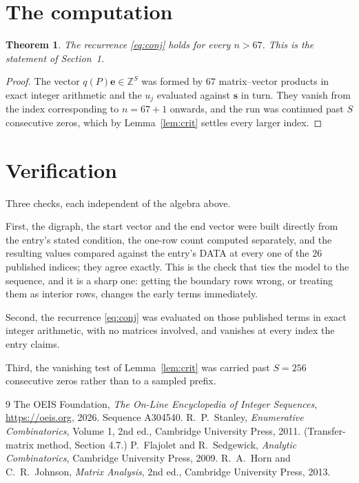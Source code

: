 \documentclass[11pt,a4paper]{article}
\theoremstyle{plain}
\newtheorem{theorem}{Theorem}
\theoremstyle{definition}
\begin{document}
\section{The computation}

\begin{theorem}
The recurrence \eqref{eq:conj} holds for every $n>67$. This is the statement of
Section~1.
\end{theorem}

\begin{proof}
The vector $q(P)\mathbf{e}\in\mathbb{Z}^{S}$ was formed by $67$ matrix--vector
products in exact integer arithmetic and the $u_j$ evaluated against $\mathbf{s}$ in turn.
They vanish from the index corresponding to $n=67+1$ onwards, and the run was continued
past $S$ consecutive zeros, which by Lemma~\ref{lem:crit} settles every larger index.
\end{proof}

\section{Verification}

Three checks, each independent of the algebra above.

First, the digraph, the start vector and the end vector were built directly from the
entry's stated condition, the one-row count computed separately, and the resulting values
compared against the entry's DATA at every one of the $26$ published indices; they
agree exactly. This is the check that ties the model to the sequence, and it is a sharp one:
getting the boundary rows wrong, or treating them as interior rows, changes the early terms
immediately.

Second, the recurrence \eqref{eq:conj} was evaluated on those published terms in exact
integer arithmetic, with no matrices involved, and vanishes at every index the entry claims.

Third, the vanishing test of Lemma~\ref{lem:crit} was carried past $S=256$ consecutive
zeros rather than to a sampled prefix.

\begin{thebibliography}{9}
 The OEIS Foundation, \emph{The On-Line Encyclopedia of Integer
Sequences}, \url{https://oeis.org}, 2026. Sequence A304540.
 R.~P.~Stanley, \emph{Enumerative Combinatorics}, Volume 1, 2nd ed.,
Cambridge University Press, 2011. (Transfer-matrix method, Section 4.7.)
 P.~Flajolet and R.~Sedgewick, \emph{Analytic Combinatorics}, Cambridge
University Press, 2009.
 R.~A.~Horn and C.~R.~Johnson, \emph{Matrix Analysis}, 2nd ed., Cambridge
University Press, 2013.
\end{thebibliography}
\end{document}
